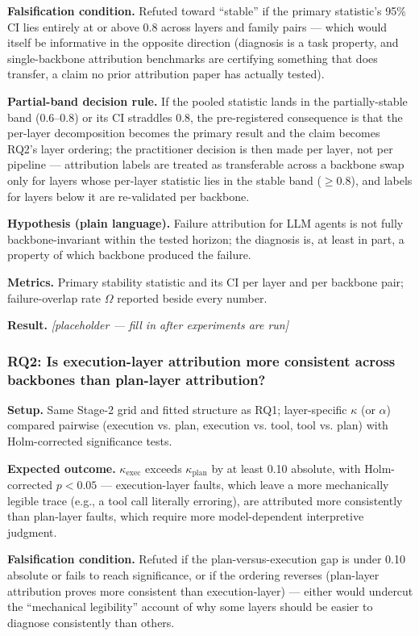 \documentclass[11pt]{article}
\newcommand{\ph}{\textit{[placeholder --- fill in after experiments are run]}}
\begin{document}
\textbf{Falsification condition.} Refuted toward ``stable'' if the primary statistic's 95\% CI lies entirely at or above 0.8 across layers and family pairs --- which would itself be informative in the opposite direction (diagnosis is a task property, and single-backbone attribution benchmarks are certifying something that does transfer, a claim no prior attribution paper has actually tested).

\textbf{Partial-band decision rule.} If the pooled statistic lands in the partially-stable band (0.6--0.8) or its CI straddles 0.8, the pre-registered consequence is that the per-layer decomposition becomes the primary result and the claim becomes RQ2's layer ordering; the practitioner decision is then made per layer, not per pipeline --- attribution labels are treated as transferable across a backbone swap only for layers whose per-layer statistic lies in the stable band ($\geq 0.8$), and labels for layers below it are re-validated per backbone.

\textbf{Hypothesis (plain language).} Failure attribution for LLM agents is not fully backbone-invariant within the tested horizon; the diagnosis is, at least in part, a property of which backbone produced the failure.

\textbf{Metrics.} Primary stability statistic and its CI per layer and per backbone pair; failure-overlap rate $\Omega$ reported beside every number.

\textbf{Result.} \ph

\subsubsection{RQ2: Is execution-layer attribution more consistent across backbones than plan-layer attribution?}
\textbf{Setup.} Same Stage-2 grid and fitted structure as RQ1; layer-specific $\kappa$ (or $\alpha$) compared pairwise (execution vs. plan, execution vs. tool, tool vs. plan) with Holm-corrected significance tests.

\textbf{Expected outcome.} $\kappa_{\text{exec}}$ exceeds $\kappa_{\text{plan}}$ by at least 0.10 absolute, with Holm-corrected $p < 0.05$ --- execution-layer faults, which leave a more mechanically legible trace (e.g., a tool call literally erroring), are attributed more consistently than plan-layer faults, which require more model-dependent interpretive judgment.

\textbf{Falsification condition.} Refuted if the plan-versus-execution gap is under 0.10 absolute or fails to reach significance, or if the ordering reverses (plan-layer attribution proves more consistent than execution-layer) --- either would undercut the ``mechanical legibility'' account of why some layers should be easier to diagnose consistently than others.
\end{document}
